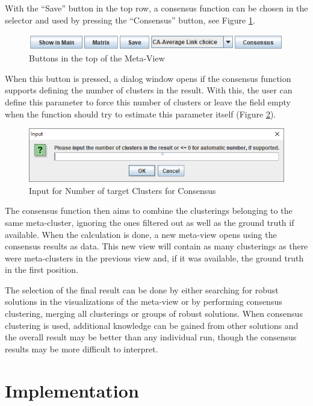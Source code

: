 \documentclass[
	a4paper,
	english,
	twoside,
	openright,               
	11pt                            
	]{report}
\begin{document}
With the ``Save'' button in the top row, a consensus function can be chosen in the selector and used by pressing the ``Consensus'' button, see Figure \ref{fig:cons_button}. 

\begin{figure}[h]
	\centering
	\includegraphics[scale=.75]{cons_button}
	\caption{Buttons in the top of the Meta-View}
	\label{fig:cons_button}
\end{figure}

When this button is pressed, a dialog window opens if the consensus function supports defining the number of clusters in the result. With this, the user can define this parameter to force this number of clusters or leave the field empty when the function should try to estimate this parameter itself (Figure \ref{fig:choosek_window}).

\begin{figure}[H]
	\centering
	\includegraphics[scale=.7]{choosek_window}
	\caption{Input for Number of target Clusters for Consensus}
	\label{fig:choosek_window}
\end{figure}

The consensus function then aims to combine the clusterings belonging to the same meta-cluster, ignoring the ones filtered out as well as the ground truth if available. When the calculation is done, a new meta-view opens using the consensus results as data. This new view will contain as many clusterings as there were meta-clusters in the previous view and, if it was available, the ground truth in the first position.

The selection of the final result can be done by either searching for robust solutions in the visualizations of the meta-view or by performing consensus clustering, merging all clusterings or groups of robust solutions. When consensus clustering is used, additional knowledge can be gained from other solutions and the overall result may be better than any individual run, though the consensus results may be more difficult to interpret.

\chapter{Implementation}\label{cha:impl}
\end{document}
